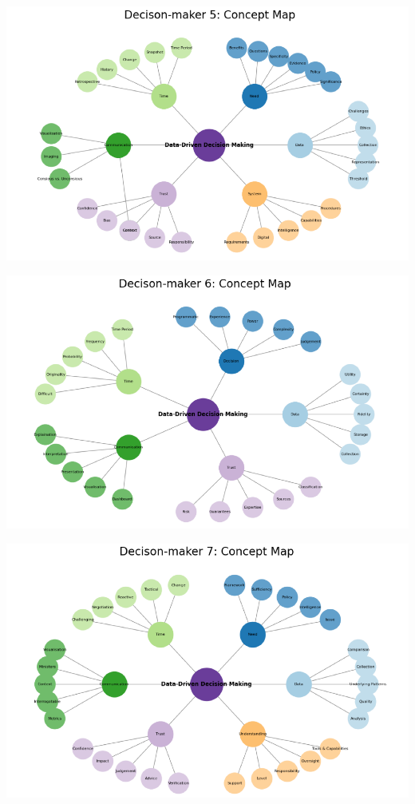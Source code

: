 \documentclass{article}
\begin{document}
\includegraphics{210431461_CSC8639_Dissertation_files/figure-latex/unnamed-chunk-8-1.pdf}

\includegraphics{210431461_CSC8639_Dissertation_files/figure-latex/unnamed-chunk-9-1.pdf}

\includegraphics{210431461_CSC8639_Dissertation_files/figure-latex/unnamed-chunk-10-1.pdf}
\end{document}
